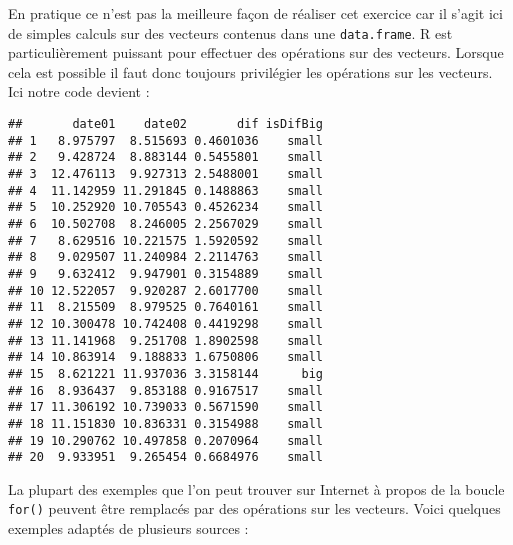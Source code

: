 \documentclass[]{book}
\newenvironment{Shaded}{\begin{snugshade}}{\end{snugshade}}
\newcommand{\KeywordTok}[1]{\textcolor[rgb]{0.13,0.29,0.53}{\textbf{#1}}}
\newcommand{\DataTypeTok}[1]{\textcolor[rgb]{0.13,0.29,0.53}{#1}}
\newcommand{\DecValTok}[1]{\textcolor[rgb]{0.00,0.00,0.81}{#1}}
\newcommand{\StringTok}[1]{\textcolor[rgb]{0.31,0.60,0.02}{#1}}
\newcommand{\OperatorTok}[1]{\textcolor[rgb]{0.81,0.36,0.00}{\textbf{#1}}}
\newcommand{\NormalTok}[1]{#1}
\theoremstyle{definition}
\theoremstyle{definition}
\theoremstyle{definition}
\theoremstyle{remark}
\begin{document}
En pratique ce n'est pas la meilleure façon de réaliser cet exercice car
il s'agit ici de simples calculs sur des vecteurs contenus dans une
\texttt{data.frame}. R est particulièrement puissant pour effectuer des
opérations sur des vecteurs. Lorsque cela est possible il faut donc
toujours privilégier les opérations sur les vecteurs. Ici notre code
devient :

\begin{Shaded}
\end{Shaded}

\begin{verbatim}
##       date01    date02       dif isDifBig
## 1   8.975797  8.515693 0.4601036    small
## 2   9.428724  8.883144 0.5455801    small
## 3  12.476113  9.927313 2.5488001    small
## 4  11.142959 11.291845 0.1488863    small
## 5  10.252920 10.705543 0.4526234    small
## 6  10.502708  8.246005 2.2567029    small
## 7   8.629516 10.221575 1.5920592    small
## 8   9.029507 11.240984 2.2114763    small
## 9   9.632412  9.947901 0.3154889    small
## 10 12.522057  9.920287 2.6017700    small
## 11  8.215509  8.979525 0.7640161    small
## 12 10.300478 10.742408 0.4419298    small
## 13 11.141968  9.251708 1.8902598    small
## 14 10.863914  9.188833 1.6750806    small
## 15  8.621221 11.937036 3.3158144      big
## 16  8.936437  9.853188 0.9167517    small
## 17 11.306192 10.739033 0.5671590    small
## 18 11.151830 10.836331 0.3154988    small
## 19 10.290762 10.497858 0.2070964    small
## 20  9.933951  9.265454 0.6684976    small
\end{verbatim}

La plupart des exemples que l'on peut trouver sur Internet à propos de
la boucle \texttt{for()} peuvent être remplacés par des opérations sur
les vecteurs. Voici quelques exemples adaptés de plusieurs sources :
\end{document}

